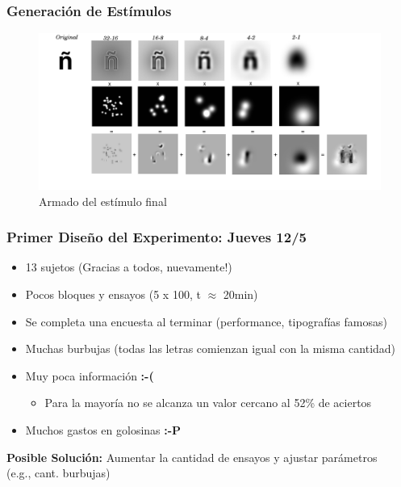 \documentclass[10pt]{beamer}
\begin{document}
	\begin{frame}
	\frametitle{Generaci\'on de Est\'imulos}
	    \begin{figure}
	    \includegraphics[width=\textwidth]{graficos/estimulofinal.png}
	    \caption{Armado del est\'imulo final}
	    \end{figure}
	\end{frame}

	\begin{frame}
	\frametitle{Primer Diseño del Experimento: Jueves 12/5}
	    \begin{itemize}
		\item 13 sujetos (Gracias a todos, nuevamente!)
		\item Pocos bloques y ensayos (5 x 100, t $\approx$ 20min)
		\item Se completa una encuesta al terminar (performance, tipografías famosas)
		\item Muchas burbujas (todas las letras comienzan igual con la misma cantidad)
		\item Muy poca información {\bf:-(}
		\begin{itemize}
		    \item Para la mayoría no se alcanza un valor cercano al 52\% de aciertos\pause
		\end{itemize}
		\item Muchos gastos en golosinas {\bf:-P}\pause
	    \end{itemize}
	\textbf{Posible Soluci\'on:} Aumentar la cantidad de ensayos y ajustar parámetros \\
	(e.g., cant. burbujas)
	\end{frame}
\end{document}
